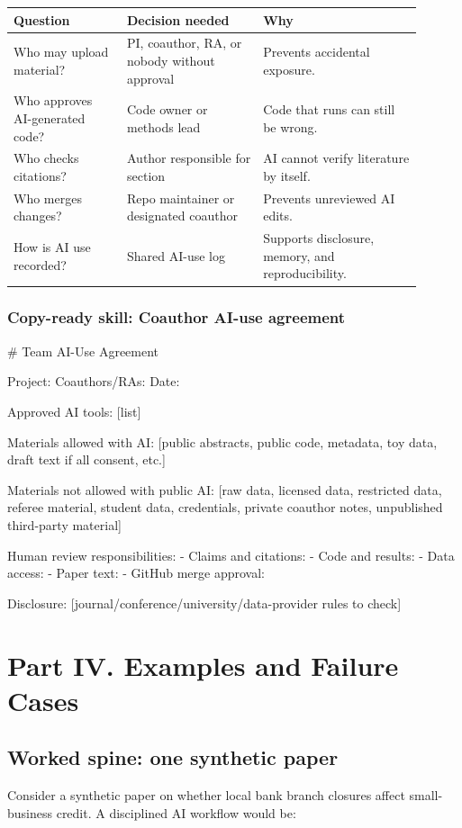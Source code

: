 \documentclass[11pt]{article}
\newcommand{\skill}[1]{\subsubsection*{Copy-ready skill: #1}}
\begin{document}
\begin{longtable}{p{0.25\linewidth}p{0.30\linewidth}p{0.35\linewidth}}
\toprule
\textbf{Question} & \textbf{Decision needed} & \textbf{Why}\\
\midrule
Who may upload material? & PI, coauthor, RA, or nobody without approval & Prevents accidental exposure.\\
Who approves AI-generated code? & Code owner or methods lead & Code that runs can still be wrong.\\
Who checks citations? & Author responsible for section & AI cannot verify literature by itself.\\
Who merges changes? & Repo maintainer or designated coauthor & Prevents unreviewed AI edits.\\
How is AI use recorded? & Shared AI-use log & Supports disclosure, memory, and reproducibility.\\
\bottomrule
\end{longtable}

\skill{Coauthor AI-use agreement}

\begin{promptblock}
# Team AI-Use Agreement

Project:
Coauthors/RAs:
Date:

Approved AI tools:
[list]

Materials allowed with AI:
[public abstracts, public code, metadata, toy data, draft text if all consent, etc.]

Materials not allowed with public AI:
[raw data, licensed data, restricted data, referee material, student data,
credentials, private coauthor notes, unpublished third-party material]

Human review responsibilities:
- Claims and citations:
- Code and results:
- Data access:
- Paper text:
- GitHub merge approval:

Disclosure:
[journal/conference/university/data-provider rules to check]
\end{promptblock}

\section{Part IV. Examples and Failure Cases}

\subsection{Worked spine: one synthetic paper}

Consider a synthetic paper on whether local bank branch closures affect small-business credit. A disciplined AI workflow would be:
\end{document}
